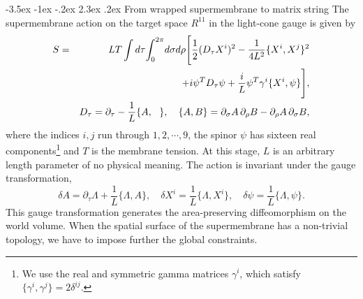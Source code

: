 \documentclass[a4paper,12pt]{article}
\makeatletter
\newcommand{\nn}{\nonumber\\}
\newcommand{\ptau}{\partial_\tau}
\renewcommand\section{\@startsection {section}{1}{\z@}%
		{-3.5ex \@plus -1ex \@minus -.2ex}%
		{2.3ex \@plus.2ex}%
		{\normalfont\large\bfseries}}
\makeatother
\begin{document}
\section{From wrapped supermembrane to matrix string}
The supermembrane action on the target space $R^{11}$ \cite{dHN} in
the light-cone gauge is given by
\begin{eqnarray}
  S&=&LT\int d\tau \!\int_0^{2\pi}\!d\sigma d\rho \Biggl[
    \frac{1}{2}(D_{\tau}X^i)^2 -\frac{1}{4L^2}\{ X^i,X^j\}^2\nn
  &&\hspace{20ex} +i\psi^T D_{\tau}\psi +\frac{i}{L}
	\psi^T\gamma^i\{ X^i,\psi\}\Biggr]\label{action1},\\
  &&D_{\tau}  =\ptau  -\frac{1}{L}\{A,~~\},\quad
  \{A,B\} = \partial_{\sigma}A\,\partial_{\rho}B -
	\partial_{\rho}A\, \partial_{\sigma}B ,
\end{eqnarray}
where the indices $i,j$ run through $1,2,\cdots,9$,
the spinor $\psi$ has sixteen real components\footnote{We use the real
and symmetric gamma matrices $\gamma^i$, which
satisfy $\{\gamma^i,\gamma^j\}=2\delta^{ij}$.}
and $T$ is the membrane tension.
At this stage, $L$ is an arbitrary length parameter of no physical
meaning. The action is invariant under the gauge transformation,
\begin{equation}
  \delta A=\ptau \Lambda + \frac{1}{L}\{\Lambda,A\},\quad
  \delta X^i= \frac{1}{L}\{\Lambda,X^i\},\quad
  \delta \psi= \frac{1}{L}\{\Lambda,\psi\}.
\end{equation}
This gauge transformation generates the area-preserving diffeomorphism
on the world volume.
When the spatial surface of the supermembrane has a non-trivial
topology, we have to impose further the global constraints.
\end{document}
